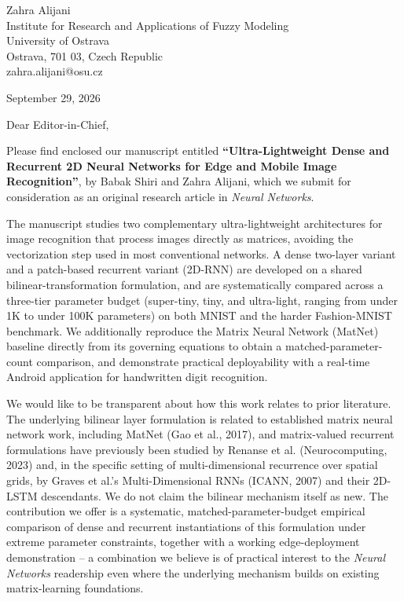 \documentclass[11pt]{article}
\begin{document}
\begin{flushleft}
Zahra Alijani\\
Institute for Research and Applications of Fuzzy Modeling\\
University of Ostrava\\
Ostrava, 701 03, Czech Republic\\
zahra.alijani@osu.cz

\vspace{1em}
September 29, 2026
\end{flushleft}

\noindent Dear Editor-in-Chief,

\vspace{1em}
\noindent Please find enclosed our manuscript entitled \textbf{``Ultra-Lightweight Dense and Recurrent 2D Neural Networks for Edge and Mobile Image Recognition''}, by Babak Shiri and Zahra Alijani, which we submit for consideration as an original research article in \emph{Neural Networks}.

\vspace{1em}
\noindent The manuscript studies two complementary ultra-lightweight architectures for image recognition that process images directly as matrices, avoiding the vectorization step used in most conventional networks. A dense two-layer variant and a patch-based recurrent variant (2D-RNN) are developed on a shared bilinear-transformation formulation, and are systematically compared across a three-tier parameter budget (super-tiny, tiny, and ultra-light, ranging from under 1K to under 100K parameters) on both MNIST and the harder Fashion-MNIST benchmark. We additionally reproduce the Matrix Neural Network (MatNet) baseline directly from its governing equations to obtain a matched-parameter-count comparison, and demonstrate practical deployability with a real-time Android application for handwritten digit recognition.

\vspace{1em}
\noindent We would like to be transparent about how this work relates to prior literature. The underlying bilinear layer formulation is related to established matrix neural network work, including MatNet (Gao et al., 2017), and matrix-valued recurrent formulations have previously been studied by Renanse et al. (Neurocomputing, 2023) and, in the specific setting of multi-dimensional recurrence over spatial grids, by Graves et al.'s Multi-Dimensional RNNs (ICANN, 2007) and their 2D-LSTM descendants. We do not claim the bilinear mechanism itself as new. The contribution we offer is a systematic, matched-parameter-budget empirical comparison of dense and recurrent instantiations of this formulation under extreme parameter constraints, together with a working edge-deployment demonstration -- a combination we believe is of practical interest to the \emph{Neural Networks} readership even where the underlying mechanism builds on existing matrix-learning foundations.
\end{document}
